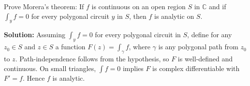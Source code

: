 \begin{problembox}
Prove Morera's theorem: If \( f \) is continuous on an open region \( S \) in \( \mathbb{C} \) and if \( \int_y f = 0 \) for every polygonal circuit \( y \) in \( S \), then \( f \) is analytic on \( S \).
\end{problembox}

\bigskip\noindent\textbf{Solution:}
Assuming $\int_y f=0$ for every polygonal circuit in $S$, define for any $z_0\in S$ and $z\in S$ a function $F(z)=\int_{\gamma} f$, where $\gamma$ is any polygonal path from $z_0$ to $z$. Path-independence follows from the hypothesis, so $F$ is well-defined and continuous. On small triangles, $\int f=0$ implies $F$ is complex differentiable with $F'=f$. Hence $f$ is analytic.
